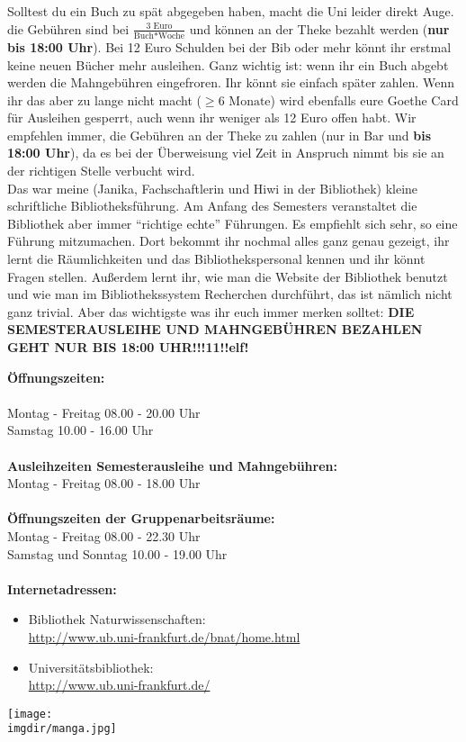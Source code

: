 Solltest du ein Buch zu spät abgegeben haben, macht die Uni leider direkt Auge. die Gebühren sind bei \(\frac{3\text{ Euro}}{\text{Buch}*\text{Woche}}\) und können an der Theke bezahlt werden (\textbf{nur bis 18:00 Uhr}). Bei 12 Euro Schulden bei der Bib oder mehr könnt ihr erstmal keine neuen Bücher mehr ausleihen. Ganz wichtig ist: wenn ihr ein Buch abgebt werden die Mahngebühren eingefroren. Ihr könnt sie einfach später zahlen. Wenn ihr das aber zu lange nicht macht (\(\geq6\text{ Monate}\)) wird ebenfalls eure Goethe Card für Ausleihen gesperrt, auch wenn ihr weniger als 12 Euro offen habt. Wir empfehlen immer, die Gebühren an der Theke zu zahlen (nur in Bar und \textbf{bis 18:00 Uhr}), da es bei der Überweisung viel Zeit in Anspruch nimmt bis sie an der richtigen Stelle verbucht wird.\\
Das war meine (Janika, Fachschaftlerin und Hiwi in der Bibliothek) kleine schriftliche Bibliotheksführung. Am Anfang des Semesters veranstaltet die Bibliothek aber immer \enquote{richtige echte} Führungen. Es empfiehlt sich sehr, so eine Führung mitzumachen. Dort bekommt ihr nochmal alles ganz genau gezeigt, ihr lernt die Räumlichkeiten und das Bibliothekspersonal kennen und ihr könnt Fragen stellen. Au\ss erdem lernt ihr, wie man die Website der Bibliothek benutzt und wie man im Bibliothekssystem Recherchen durchführt, das ist nämlich nicht ganz trivial. Aber das wichtigste was ihr euch immer merken solltet: \textbf{DIE SEMESTERAUSLEIHE UND MAHNGEBÜHREN BEZAHLEN GEHT NUR BIS 18:00 UHR!!!11!!elf!}\\
\begin{minipage}{0.5\textwidth}
\noindent
\textbf{Öffnungszeiten:}\\\\
Montag - Freitag 08.00 - 20.00 Uhr\\
Samstag 10.00 - 16.00 Uhr\\\\
\noindent
\textbf{Ausleihzeiten Semesterausleihe und Mahngebühren:}\\
Montag - Freitag  08.00 - 18.00 Uhr\\\\
\noindent
\textbf{Öffnungszeiten der Gruppenarbeitsräume:}\\
Montag - Freitag  08.00 - 22.30 Uhr\\
Samstag und Sonntag 10.00 - 19.00 Uhr\\\\
\noindent
\textbf{Internetadressen:}
\begin{itemize}
   \item{Bibliothek Naturwissenschaften:}\\\url{http://www.ub.uni-frankfurt.de/bnat/home.html}
   \item{Universitätsbibliothek:}\\\url{http://www.ub.uni-frankfurt.de/}
\end{itemize}
\end{minipage}
\begin{minipage}{0.5\textwidth}
	\centering
  	\texttt{[image: \\imgdir/manga.jpg]}
\end{minipage}
